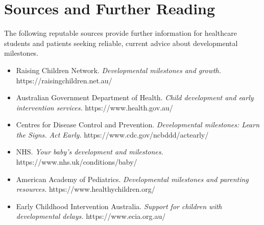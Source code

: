 \section*{Sources and Further Reading}
The following reputable sources provide further information for healthcare students and patients seeking reliable, current advice about developmental milestones.

\begin{itemize}
    \item Raising Children Network. \textit{Developmental milestones and growth.} https://raisingchildren.net.au/
    \item Australian Government Department of Health. \textit{Child development and early intervention services.} https://www.health.gov.au/
    \item Centres for Disease Control and Prevention. \textit{Developmental milestones: Learn the Signs. Act Early.} https://www.cdc.gov/ncbddd/actearly/
    \item NHS. \textit{Your baby's development and milestones.} https://www.nhs.uk/conditions/baby/
    \item American Academy of Pediatrics. \textit{Developmental milestones and parenting resources.} https://www.healthychildren.org/
    \item Early Childhood Intervention Australia. \textit{Support for children with developmental delays.} https://www.ecia.org.au/
\end{itemize}
